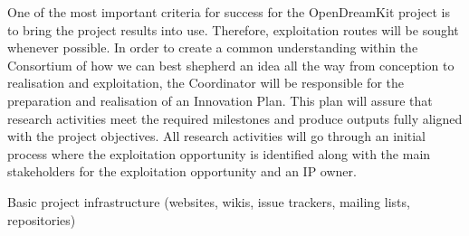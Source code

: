 \begin{workpackage}
\begin{tasklist}
\begin{task}[title=Innovation management,wphases=6-48!.2,
id=project-innovation-management,lead=PS,PM=10,
partners={LL,UV,UJF,UB,UO,USH,USO,SA,UW,JU,UK,US,ZH,SR}] One of the
  most important criteria for success for the OpenDreamKit project is
  to bring the project results into use. Therefore, exploitation
  routes will be sought whenever possible. In order to create a common
  understanding within the Consortium of how we can best shepherd an
  idea all the way from conception to realisation and
  exploitation, the Coordinator will be responsible for the
  preparation and realisation of an Innovation Plan. This plan will assure that
  research activities meet the required milestones and produce outputs 
  fully aligned with the project objectives.  All
  research activities will go through an initial process where the
  exploitation opportunity is identified along with the main
  stakeholders for the exploitation opportunity and an IP owner.
\end{task}
\end{tasklist}

%


\begin{wpdelivs}
\begin{wpdeliv}[due=1,miles=startup,id=tickets,dissem=PU,nature=DEC,lead=PS]{Basic project infrastructure 
    (websites, wikis, issue trackers, mailing lists, repositories)}
\end{wpdeliv}


\end{wpdelivs}
\end{workpackage}
